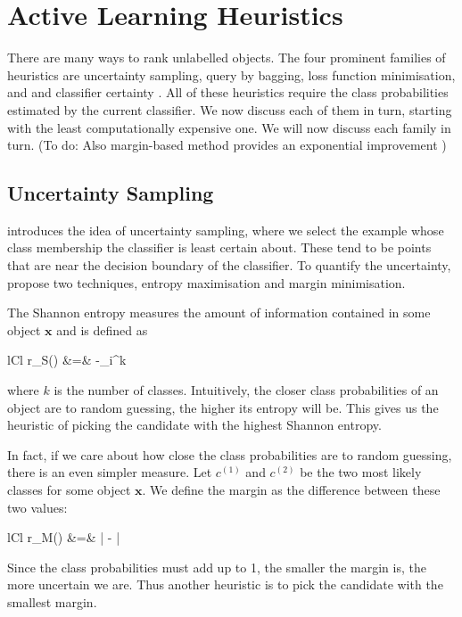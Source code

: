 \section{Active Learning Heuristics}
\label{sec:heuristics}

There are many ways to rank unlabelled objects. The four prominent families
of heuristics are uncertainty sampling, query by bagging, loss function minimisation, and
and classifier certainty \cite{schein07}. All of these heuristics require the
class probabilities estimated by the current classifier. 
We now discuss each of them in turn, starting with the least computationally expensive
one. We will now discuss each family in turn.
(To do: Also margin-based method 
provides an exponential improvement \cite{balcan12})

\subsection{Uncertainty Sampling}

 introduces the idea of uncertainty sampling, where we select the example
whose class membership the classifier is least certain about.
These tend to be points that are near the decision boundary of the classifier. To quantify
the uncertainty,  propose two techniques, entropy maximisation and
margin minimisation.

The Shannon entropy measures the amount of information contained in some object $\bm{x}$
and is defined as
	\begin{IEEEeqnarray*}{lCl}
		r_S() &=& -\sum_i^k  \log \big[\Prob{y(\bm{x}) = i} \big]
	\end{IEEEeqnarray*}
where $k$ is the number of classes. Intuitively, the closer class probabilities of an object
are to random guessing, the higher its entropy will be. This gives us the heuristic
of picking the candidate with the highest Shannon entropy.

In fact, if we care about how close the class probabilities are to random guessing, 
there is an even simpler measure. 
Let $c^{(1)}$ and $c^{(2)}$ be the two most likely classes for some object $\bm{x}$.
We define the margin as the difference between these two values:
	\begin{IEEEeqnarray*}{lCl}
		r_M() &=& \Big|   -   \Big|
	\end{IEEEeqnarray*}
Since the class probabilities must add up to 1, the smaller the margin is,
the more uncertain we are. Thus another heuristic is
to pick the candidate with the smallest margin.


